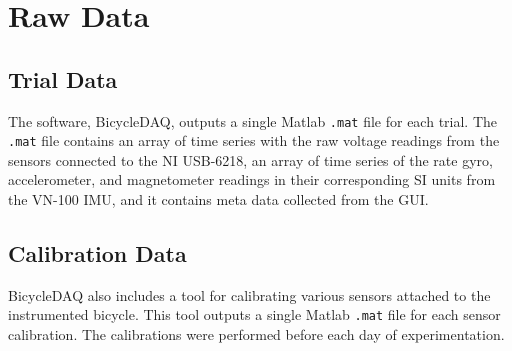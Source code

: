 \documentclass{article}
\begin{document}
\section{Raw Data}

\subsection{Trial Data}

The software, BicycleDAQ, outputs a single Matlab \verb|.mat| file for each
trial. The \verb|.mat| file contains an array of time series with the raw
voltage readings from the sensors connected to the NI USB-6218, an array of
time series of the rate gyro, accelerometer, and magnetometer readings in
their corresponding SI units from the VN-100 IMU, and it contains meta data
collected from the GUI.

\subsection{Calibration Data}

BicycleDAQ also includes a tool for calibrating various sensors attached to the
instrumented bicycle. This tool outputs a single Matlab \verb|.mat| file for
each sensor calibration. The calibrations were performed before each day of
experimentation.
\end{document}
